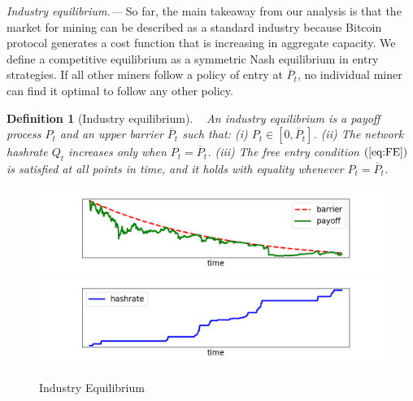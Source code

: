 \documentclass[12pt, a4paper]{article}
\newtheorem{defn}[thm]{Definition}
\begin{document}
\emph{Industry equilibrium.---} So far, the main takeaway from our analysis
is that the market for mining can be described as a standard industry
because Bitcoin protocol generates a
cost function that is increasing in aggregate capacity. We
define a competitive equilibrium as a symmetric Nash equilibrium in entry strategies.
If all other miners follow a policy of entry at $\overline{P}_t$,
no individual miner can find it optimal to follow any other policy.

\begin{defn}[Industry equilibrium]
~\newline
\label{def:industry-eq} An industry equilibrium is a payoff process $P_t$
and an upper barrier $\overline{P}_t$ such that:\newline
(i) $P_t \in [0, \overline{P}_t]$.\newline
(ii) The network hashrate $Q_{t}$ increases only when $P_{t}=\overline{P}%
_{t}$.\newline
(iii) The free entry condition $\left( \ref{eq:FE}\right) $ is satisfied at
all points in time, and it holds with equality whenever $P_{t}=\overline{P}%
_{t}$.

\end{defn}

\begin{figure}[]
\caption{Industry Equilibrium}
\label{Fig_Eq}\centering
\includegraphics[scale=0.6]{images/exemple_payoff.png} %
\includegraphics[scale=0.6]{images/exemple_hashrate.png}
\end{figure}
\end{document}
